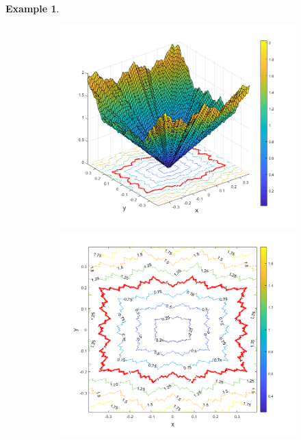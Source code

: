 \documentclass[11pt]{article}
\newtheorem{example}{Example}
\begin{document}
\begin{example}
\begin{figure}[!htb]
    \centering
    \hspace{10pt}
    \begin{subfigure}{0.5\textwidth}
    \centering
    \includegraphics[scale=0.4]{WeierstrassP_and_levelsets.png}
    \vspace{-10pt}
    \includegraphics[scale=0.4]{WeierstrassP_levelsets.png}
    \end{subfigure}%

\end{figure}
\end{example}
\end{document}
